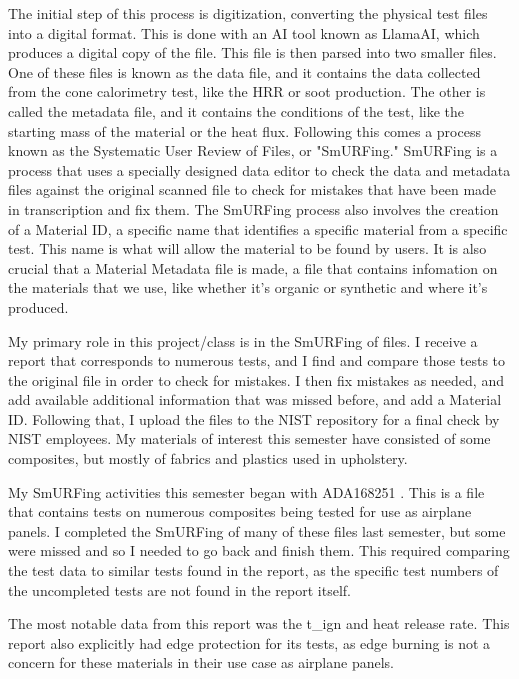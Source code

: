 \documentclass{abstract}
\begin{document}
The initial step of this process is digitization, converting the physical test files into a digital format. This is done with an AI tool known as LlamaAI, which produces a digital copy of the file. This file is then parsed into two smaller files. One of these files is known as the data file, and it contains the data collected from the cone calorimetry test, like the HRR or soot production. The other is called the metadata file, and it contains the conditions of the test, like the starting mass of the material or the heat flux. Following this comes a process known as the Systematic User Review of Files, or "SmURFing." SmURFing is a process that uses a specially designed data editor to check the data and metadata files against the original scanned file to check for mistakes that have been made in transcription and fix them. The SmURFing process also involves the creation of a Material ID, a specific name that identifies a specific material from a specific test. This name is what will allow the material to be found by users. It is also crucial that a Material Metadata file is made, a file that contains infomation on the materials that we use, like whether it's organic or synthetic and where it's produced.

My primary role in this project/class is in the SmURFing of files. I receive a report that corresponds to numerous tests, and I find and compare those tests to the original file in order to check for mistakes. I then fix mistakes as needed, and add available additional information that was missed before, and add a Material ID. Following that, I upload the files to the NIST repository for a final check by NIST employees. My materials of interest this semester have consisted of some composites, but mostly of fabrics and plastics used in upholstery.

My SmURFing activities this semester began with ADA168251 \cite{ADA168251}. This is a file that contains tests on numerous composites being tested for use as airplane panels. I completed the SmURFing of many of these files last semester, but some were missed and so I needed to go back and finish them. This required comparing the test data to similar tests found in the report, as the specific test numbers of the uncompleted tests are not found in the report itself. 

The most notable data from this report was the t\_ign and heat release rate. This report also explicitly had edge protection for its tests, as edge burning is not a concern for these materials in their use case as airplane panels.
\end{document}
